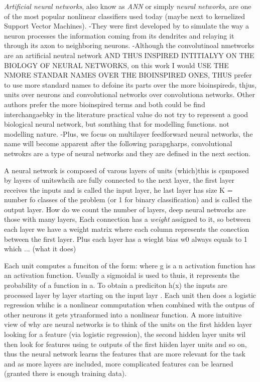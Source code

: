 \emph{Artificial neural networks}, also know as \emph{ANN} or simply \emph{neural networks}, are one of the most popular nonlinear classifiers used today (maybe next to kernelized Support Vector Machines).
-They were first developed by to simulate the way a neuron processes the information coming from its dendrites and relaying it through its axon to neighboring neurons.
-Although the convolutinoal nmetworks are an artificial neutral network AND THUS INSPIRED INTITIALYY ON THE BIOLOGY OF NEURAL NETWORKS, on this work I would USE THE NMORE STANDAR NAMES OVER THE BIOINSPIRED ONES, THUS prefer to use more standard names to defoine its parts over the more bioinspireds, thjus, units over neurons and convolutional networks over convolutiona networks. Other authors prefer the more bioinspired terms and both could be find interchangaebky in the literature
practical value
do not try to represent a good biological neural network, but somthing that for modelling functions. 
not modelling nature.
-Plus, we focus on multilayer feedforward neural networks, the name will become apparent after the following parapgharps, convolutional netwokrs are a type of neural networks and they are defined in the next section.


A neural network is composed of varous layers of units (which)this is cpmposed by layers of unitswhcih are fully connected to the next layer, the first layer receives the inputs  and is called the input layer, he last layer has size K = number fo classes of the problem (or 1 for binary classification) and is called the output layer. 
How do we count the number of layers, deep neural networks are those with many layers, 
Each connection has a \emph{weight} assigned to it, so between each layer we have a weight matrix  where each column represents the conection between the first layer. Plus each layer has a wieght bias w0 always equals to 1 which ... (what it does)

Each unit computes a funciton of the form:
where g is a n activation function has an activation function. Usually a sigmoidal is used to thuis, it represents the probability of a function in a. 
To obtain a prediciton h(x) the inputs are processed layer by layer starting on the input layr . 
Each unit then does a logistic regression whihc is a nonlinear commputation when combined with the outpus of other neurons it gets ytranformed into a nonlinear function. A more intuitive view of why are neural networks is to think of the units on the first hidden layer looking for a feature (via logistic regression), the second hidden layer units wil then look for features using te outputs of the first hiiden layer units and so on, thus the neural network learns the features that are more relevant for the task and as more layers are included, more complicated features can be learned (granted there is enough training data).

